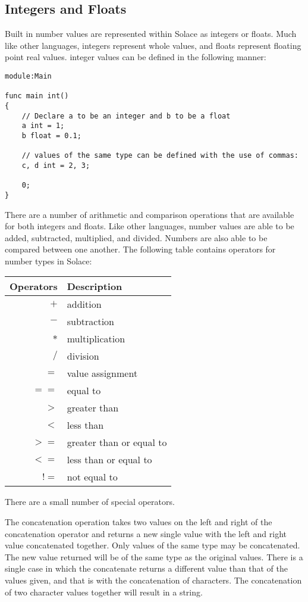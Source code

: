 \documentclass{article}
\begin{document}
\subsection{Integers and Floats}

Built in number values are represented within Solace as integers or floats. Much like other
languages, integers represent whole values, and floats represent floating point real values.
integer values can be defined in the following manner:

\begin{lstlisting}
module:Main

func main int()
{
	// Declare a to be an integer and b to be a float
	a int = 1;
	b float = 0.1;
	
	// values of the same type can be defined with the use of commas:
	c, d int = 2, 3;
	
	0;
}
\end{lstlisting}

There are a number of arithmetic and comparison operations that are available for both integers
and floats. Like other languages, number values are able to be added, subtracted, multiplied,
and divided. Numbers are also able to be compared between one another. The following table 
contains operators for number types in Solace:

\begin{center}
\begin{tabular}{|r|l|}
	\hline
	Operators & Description \\
	\hline
	\hline
	$+$ & addition \\
	$-$ & subtraction \\
	$*$ & multiplication \\
	$/$ & division \\
	\hline
	$=$ & value assignment \\
	$==$ & equal to \\
	$>$ & greater than \\
	$<$ & less than \\
	$>=$ & greater than or equal to \\
	$<=$ & less than or equal to \\
	$!=$ & not equal to \\
	\hline
\end{tabular}
\end{center}

There are a small number of special operators. 

The concatenation operation takes two values
on the left and right of the concatenation operator and returns a new single value with
the left and right value concatenated together. Only values of the same type may be
concatenated. The new value returned will be of the same type as the original values.
There is a single case in which the concatenate returns a different value than that of the
values given, and that is with the concatenation of characters. The concatenation of two
character values together will result in a string.
\end{document}
